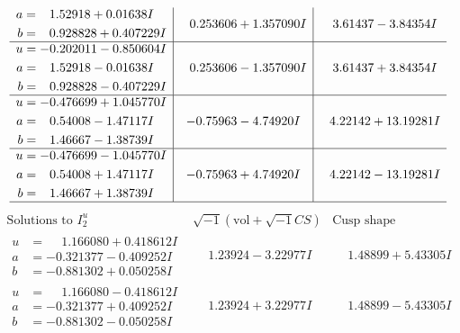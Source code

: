 \documentclass[1p]{elsarticle_modified}
\theoremstyle{definition}
\newcommand{\I}{\sqrt{-1}}
\begin{document}
$$\begin{array}{c|c|c}
\begin{aligned}
a &= \phantom{-}1.52918 + 0.01638 I \\
b &= \phantom{-}0.928828 + 0.407229 I\end{aligned}
 & \phantom{-}0.253606 + 1.357090 I & \phantom{-}3.61437 - 3.84354 I \\ \hline\begin{aligned}
u &= -0.202011 - 0.850604 I \\
a &= \phantom{-}1.52918 - 0.01638 I \\
b &= \phantom{-}0.928828 - 0.407229 I\end{aligned}
 & \phantom{-}0.253606 - 1.357090 I & \phantom{-}3.61437 + 3.84354 I \\ \hline\begin{aligned}
u &= -0.476699 + 1.045770 I \\
a &= \phantom{-}0.54008 - 1.47117 I \\
b &= \phantom{-}1.46667 - 1.38739 I\end{aligned}
 & -0.75963 - 4.74920 I & \phantom{-}4.22142 + 13.19281 I \\ \hline\begin{aligned}
u &= -0.476699 - 1.045770 I \\
a &= \phantom{-}0.54008 + 1.47117 I \\
b &= \phantom{-}1.46667 + 1.38739 I\end{aligned}
 & -0.75963 + 4.74920 I & \phantom{-}4.22142 - 13.19281 I\\
 \hline 
 \end{array}$$\newpage$$\begin{array}{c|c|c}  
\text{Solutions to }I^u_{2}& \I (\text{vol} + \sqrt{-1}CS) & \text{Cusp shape}\\
 \hline 
\begin{aligned}
u &= \phantom{-}1.166080 + 0.418612 I \\
a &= -0.321377 - 0.409252 I \\
b &= -0.881302 + 0.050258 I\end{aligned}
 & \phantom{-}1.23924 - 3.22977 I & \phantom{-}1.48899 + 5.43305 I \\ \hline\begin{aligned}
u &= \phantom{-}1.166080 - 0.418612 I \\
a &= -0.321377 + 0.409252 I \\
b &= -0.881302 - 0.050258 I\end{aligned}
 & \phantom{-}1.23924 + 3.22977 I & \phantom{-}1.48899 - 5.43305 I \\ \hline\begin{aligned}

\end{aligned}
\end{array}$$
\end{document}
